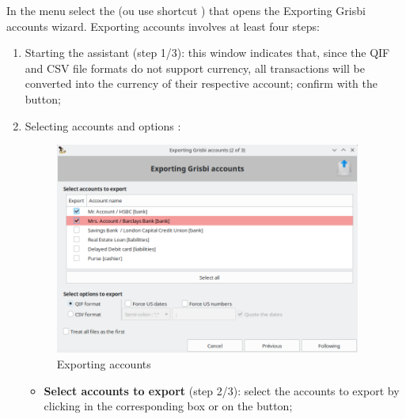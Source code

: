 In the  menu select the  (ou use shortcut ) that opens the Exporting Grisbi accounts wizard. Exporting accounts involves at least four steps:

\begin{enumerate}
	\item Starting the assistant (step 1/3): this window indicates that, since the \gls{QIF} and \gls{CSV} file formats do not support currency, all transactions will be converted into the currency of their respective account; confirm with the  button;
	\item Selecting accounts and options :
		\begin{figure}[htbp]
			\begin{center}
				\includegraphics[width=0.95\textwidth]{image/screenshot/importexport_export}
			\end{center}
			\caption{Exporting accounts}%
			\label{importexport-export-img}
		\end{figure}
		\begin{itemize}
			\item \textbf{Select accounts to export} (step 2/3): select the accounts to export by clicking in the corresponding box or on the  button;

\end{itemize}
\end{enumerate}

